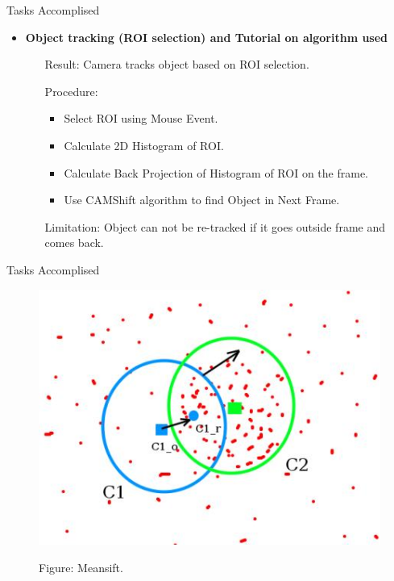 \documentclass[10pt, a4paper]{beamer}
\begin{document}
\begin{frame}{Tasks Accomplised}
	\begin{itemize}		
		\item \textbf{Object tracking (ROI selection) and Tutorial on algorithm used}
		
		\begin{itemize}
			\item[Result:] Camera tracks object  based on ROI selection.
			
			\item[Procedure:]
			\begin{itemize}
				\item Select ROI using Mouse Event.
				\item Calculate 2D Histogram of ROI.
				\item Calculate Back Projection of Histogram of ROI on the frame.
				\item Use CAMShift algorithm to find Object in Next Frame.
			\end{itemize}
			
			\item[Limitation:]Object can not be re-tracked if it goes outside frame and comes back.
		\end{itemize}
	\end{itemize}
\end{frame}
\begin{frame}{Tasks Accomplised}
	\begin{figure}
		\begin{center}
			\includegraphics[scale=0.5]{meanshift.jpg}
		\end{center}
		\begin{center}
			Figure: Meansift.
		\end{center}
	\end{figure}
\end{frame}
\end{document}
